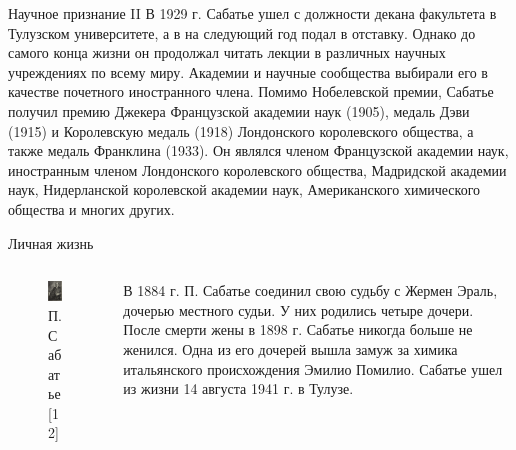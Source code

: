 \documentclass[hyperref={pdfpagelabel=false},usepdftitle=false,xcolor=dvipsnames]{beamer}
\begin{document}
\begin{frame}{Научное признание II}
	В 1929 г. Сабатье ушел с должности декана факультета в Тулузском университете, а в на следующий год подал в отставку. Однако до самого конца жизни он продолжал читать лекции в различных научных учреждениях по всему миру. Академии и научные сообщества выбирали его в качестве почетного иностранного члена. Помимо Нобелевской премии, Сабатье получил премию Джекера Французской академии наук (1905), медаль Дэви (1915) и Королевскую медаль (1918) Лондонского королевского общества, а также медаль Франклина (1933). Он являлся членом Французской академии наук, иностранным членом Лондонского королевского общества, Мадридской академии наук, Нидерланской королевской академии наук, Американского химического общества и многих других.
\end{frame}

\begin{frame}{Личная жизнь}
	\begin{columns}
	\begin{column}{0.5\linewidth}
		\begin{figure}
			\includegraphics[width = 0.75\linewidth]{pictures/sabatier2.png}
			\caption{П. Сабатье [12]}
		\end{figure}
	\end{column}
	\begin{column}{0.5\linewidth}
			В 1884 г. П. Сабатье соединил свою судьбу с Жермен Эраль, дочерью местного судьи. У них родились четыре дочери. После смерти жены в 1898 г. Сабатье никогда больше не женился. Одна из его дочерей вышла замуж за химика итальянского происхождения Эмилио Помилио. Сабатье ушел из жизни 14 августа 1941 г. в Тулузе.
	\end{column}
	\end{columns}
\end{frame}
\end{document}
